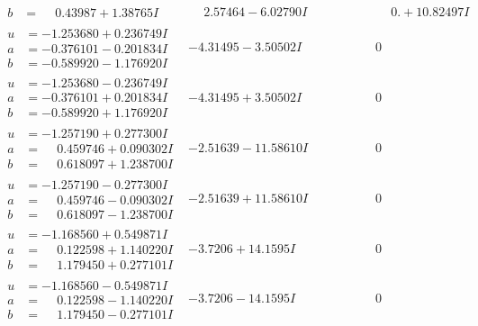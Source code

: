 \documentclass[1p]{elsarticle_modified}
\theoremstyle{definition}
\begin{document}
$$\begin{array}{c|c|c}
\begin{aligned}
b &= \phantom{-}0.43987 + 1.38765 I\end{aligned}
 & \phantom{-}2.57464 - 6.02790 I & \phantom{-0.000000 -}0. + 10.82497 I \\ \hline\begin{aligned}
u &= -1.253680 + 0.236749 I \\
a &= -0.376101 - 0.201834 I \\
b &= -0.589920 - 1.176920 I\end{aligned}
 & -4.31495 - 3.50502 I & \phantom{-0.000000 } 0 \\ \hline\begin{aligned}
u &= -1.253680 - 0.236749 I \\
a &= -0.376101 + 0.201834 I \\
b &= -0.589920 + 1.176920 I\end{aligned}
 & -4.31495 + 3.50502 I & \phantom{-0.000000 } 0 \\ \hline\begin{aligned}
u &= -1.257190 + 0.277300 I \\
a &= \phantom{-}0.459746 + 0.090302 I \\
b &= \phantom{-}0.618097 + 1.238700 I\end{aligned}
 & -2.51639 - 11.58610 I & \phantom{-0.000000 } 0 \\ \hline\begin{aligned}
u &= -1.257190 - 0.277300 I \\
a &= \phantom{-}0.459746 - 0.090302 I \\
b &= \phantom{-}0.618097 - 1.238700 I\end{aligned}
 & -2.51639 + 11.58610 I & \phantom{-0.000000 } 0 \\ \hline\begin{aligned}
u &= -1.168560 + 0.549871 I \\
a &= \phantom{-}0.122598 + 1.140220 I \\
b &= \phantom{-}1.179450 + 0.277101 I\end{aligned}
 & -3.7206 + 14.1595 I & \phantom{-0.000000 } 0 \\ \hline\begin{aligned}
u &= -1.168560 - 0.549871 I \\
a &= \phantom{-}0.122598 - 1.140220 I \\
b &= \phantom{-}1.179450 - 0.277101 I\end{aligned}
 & -3.7206 - 14.1595 I & \phantom{-0.000000 } 0 \\ \hline\begin{aligned}

\end{aligned}
\end{array}$$
\end{document}
